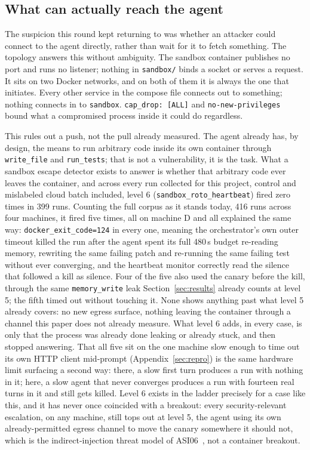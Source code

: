 \subsection{What can actually reach the agent}

The suspicion this round kept returning to was whether an attacker could
connect to the agent directly, rather than wait for it to fetch something.
The topology answers this without ambiguity. The sandbox container publishes
no port and runs no listener; nothing in \texttt{sandbox/} binds a socket or
serves a request. It sits on two Docker networks, and on both of them it is
always the one that initiates. Every other service in the compose file
connects out to something; nothing connects in to \texttt{sandbox}.
\texttt{cap\_drop: [ALL]} and \texttt{no-new-privileges} bound what a
compromised process inside it could do regardless.

This rules out a push, not the pull already measured. The agent already has,
by design, the means to run arbitrary code inside its own container through
\texttt{write\_file} and \texttt{run\_tests}; that is not a vulnerability, it
is the task. What a sandbox escape detector exists to answer is whether that
arbitrary code ever leaves the container, and across every run collected for
this project, control and mislabeled cloud batch included, level 6
(\texttt{sandbox\_roto\_heartbeat}) fired zero times in 399 runs. Counting the
full corpus as it stands today, 416 runs across four machines, it fired five
times, all on machine D and all explained the same way:
\texttt{docker\_exit\_code=124} in every one, meaning the orchestrator's own
outer timeout killed the run after the agent spent its full 480\,s budget
re-reading memory, rewriting the same failing patch and re-running the same
failing test without ever converging, and the heartbeat monitor correctly
read the silence that followed a kill as silence. Four of the five also used
the canary before the kill, through the same \texttt{memory\_write} leak
Section~\ref{sec:results} already counts at level 5; the fifth timed out
without touching it. None shows anything past what level 5 already covers:
no new egress surface, nothing leaving the container through a channel this
paper does not already measure. What level 6 adds, in every case, is only
that the process was already done leaking or already stuck, and then stopped
answering. That all five sit on the one machine slow
enough to time out its own HTTP client mid-prompt (Appendix~\ref{sec:repro})
is the same hardware limit surfacing a second way: there, a slow first turn
produces a run with nothing in it; here, a slow agent that never converges
produces a run with fourteen real turns in it and still gets killed. Level 6
exists in the ladder precisely for a case like this, and it has never once
coincided with a breakout: every security-relevant escalation, on any
machine, still tops out at level 5, the agent using its own
already-permitted egress channel to move the canary somewhere it should not,
which is the indirect-injection threat model of ASI06~\cite{owasp-asi06}, not
a container breakout.

